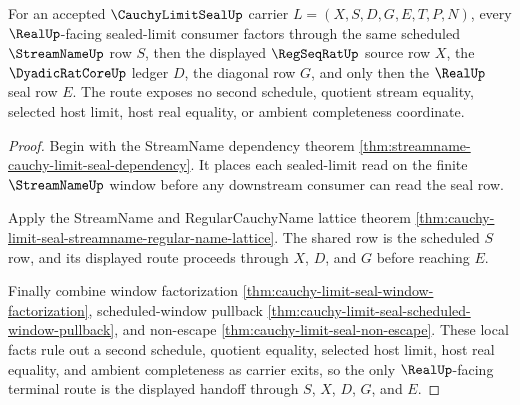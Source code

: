 \begin{theorem}
\label{thm:cauchy-limit-seal-streamname-real-terminal-handoff}
For an accepted $\CauchyLimitSealUp$ carrier $L=(X,S,D,G,E,T,P,N)$, every $\RealUp$-facing sealed-limit consumer factors through the same scheduled $\StreamNameUp$ row $S$, then the displayed $\RegSeqRatUp$ source row $X$, the $\DyadicRatCoreUp$ ledger $D$, the diagonal row $G$, and only then the $\RealUp$ seal row $E$. The route exposes no second schedule, quotient stream equality, selected host limit, host real equality, or ambient completeness coordinate.
\end{theorem}
\begin{proof}
Begin with the StreamName dependency theorem \autoref{thm:streamname-cauchy-limit-seal-dependency}. It places each sealed-limit read on the finite $\StreamNameUp$ window before any downstream consumer can read the seal row.

Apply the StreamName and RegularCauchyName lattice theorem \autoref{thm:cauchy-limit-seal-streamname-regular-name-lattice}. The shared row is the scheduled $S$ row, and its displayed route proceeds through $X$, $D$, and $G$ before reaching $E$.

Finally combine window factorization \autoref{thm:cauchy-limit-seal-window-factorization}, scheduled-window pullback \autoref{thm:cauchy-limit-seal-scheduled-window-pullback}, and non-escape \autoref{thm:cauchy-limit-seal-non-escape}. These local facts rule out a second schedule, quotient equality, selected host limit, host real equality, and ambient completeness as carrier exits, so the only $\RealUp$-facing terminal route is the displayed handoff through $S$, $X$, $D$, $G$, and $E$.
\end{proof}

